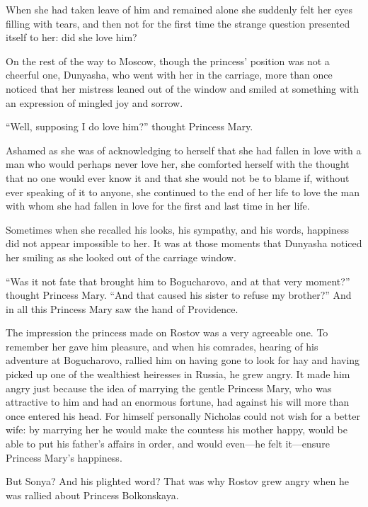 When she had taken leave of him and remained alone she suddenly
felt her eyes filling with tears, and then not for the first time
the strange question presented itself to her: did she love him?

On the rest of the way to Moscow, though the princess' position
was not a cheerful one, Dunyasha, who went with her in the
carriage, more than once noticed that her mistress leaned out of
the window and smiled at something with an expression of mingled
joy and sorrow.

``Well, supposing I do love him?'' thought Princess Mary.

Ashamed as she was of acknowledging to herself that she had
fallen in love with a man who would perhaps never love her, she
comforted herself with the thought that no one would ever know it
and that she would not be to blame if, without ever speaking of
it to anyone, she continued to the end of her life to love the
man with whom she had fallen in love for the first and last time
in her life.

Sometimes when she recalled his looks, his sympathy, and his
words, happiness did not appear impossible to her. It was at
those moments that Dunyasha noticed her smiling as she looked out
of the carriage window.

``Was it not fate that brought him to Bogucharovo, and at that
very moment?'' thought Princess Mary. ``And that caused his
sister to refuse my brother?'' And in all this Princess Mary saw
the hand of Providence.

The impression the princess made on Rostov was a very agreeable
one. To remember her gave him pleasure, and when his comrades,
hearing of his adventure at Bogucharovo, rallied him on having
gone to look for hay and having picked up one of the wealthiest
heiresses in Russia, he grew angry. It made him angry just
because the idea of marrying the gentle Princess Mary, who was
attractive to him and had an enormous fortune, had against his
will more than once entered his head. For himself personally
Nicholas could not wish for a better wife: by marrying her he
would make the countess his mother happy, would be able to put
his father's affairs in order, and would even---he felt
it---ensure Princess Mary's happiness.

But Sonya? And his plighted word? That was why Rostov grew angry
when he was rallied about Princess Bolkonskaya.


